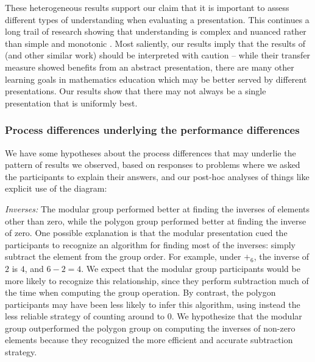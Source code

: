 \documentclass[man,10pt]{apa6}
\begin{document}
These heterogeneous results support our claim that it is important to assess different types of understanding when evaluating a presentation. This continues a long trail of research showing that understanding is complex and nuanced rather than simple and monotonic \cite{Greeno1987,Bisanz1992,Nokes2005}. Most saliently, our results imply that the results of  (and other similar work) should be interpreted with caution -- while their transfer measure showed benefits from an abstract presentation, there are many other learning goals in mathematics education which may be better served by different presentations. Our results show that there may not always be a single presentation that is uniformly best. 
\subsubsection{Process differences underlying the performance differences}
We have some hypotheses about the process differences that may underlie the pattern of results we observed, based on responses to problems where we asked the participants to explain their answers, and our post-hoc analyses of things like explicit use of the diagram:\par 
\textit{Inverses:} The modular group performed better at finding the inverses of elements other than zero, while the polygon group performed better at finding the inverse of zero. One possible explanation is that the modular presentation cued the participants to recognize an algorithm for finding most of the inverses: simply subtract the element from the group order. For example, under $+_6$, the inverse of $2$ is $4$, and $6-2 = 4$. We expect that the modular group participants would be more likely to recognize this relationship, since they perform subtraction much of the time when computing the group operation. By contrast, the polygon participants may have been less likely to infer this algorithm, using instead the less reliable strategy of counting around to 0. We hypothesize that the modular group outperformed the polygon group on computing the inverses of non-zero elements because they recognized the more efficient and accurate subtraction strategy. \par 
\end{document}
